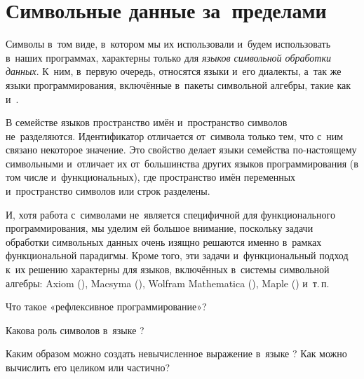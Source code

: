 \section{Символьные данные за~пределами~\Scheme}%
Символы в~том виде, в~котором мы их использовали и~будем использовать в~наших программах, характерны только для \emph{языков символьной обработки данных}. К~ним, в~первую очередь, относятся языки  \Lisp и~его диалекты, а~так же языки программирования, включённые в~пакеты символьной алгебры, такие как  и~.

В семействе языков \Lisp пространство имён и~пространство символов не~разделяются. Идентификатор отличается от~символа только тем, что с~ним связано некоторое значение. Это свойство делает языки семейства \Lisp по-настоящему символьными и~отличает их от~большинства других языков программирования (в том числе и~функциональных), где пространство имён переменных и~пространство символов или строк разделены.

И, хотя работа с~символами не~является специфичной для функционального программирования, мы уделим ей большое внимание, поскольку задачи обработки символьных данных очень изящно решаются именно в~рамках функциональной парадигмы. Кроме того, эти задачи и~функциональный подход к~их решению характерны для языков, включённых в~системы символьной алгебры: Axiom (), Macsyma (\Lisp), Wolfram Mathematica (), Maple () и~т.\,п.

\begin{Queeze}
 \item Что такое «рефлексивное программирование»?

 \item Какова роль символов в~языке \Scheme?

 \item Каким образом можно создать невычисленное выражение в~языке \Scheme? Как можно вычислить его целиком или частично?
\end{Queeze}
